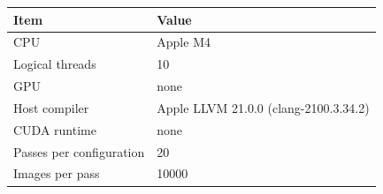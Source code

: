 \begin{tabular}{ll}
\toprule
Item & Value \\
\midrule
CPU & Apple M4 \\
Logical threads & 10 \\
GPU & none \\
Host compiler & Apple LLVM 21.0.0 (clang-2100.3.34.2) \\
CUDA runtime & none \\
Passes per configuration & 20 \\
Images per pass & 10000 \\
\bottomrule
\end{tabular}
